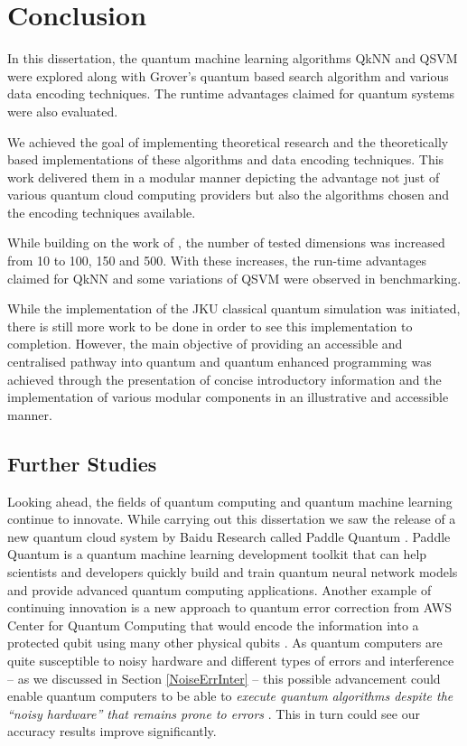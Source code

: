 \chapter{Conclusion}

In this dissertation, the quantum machine learning algorithms QkNN and QSVM were explored along with Grover's quantum based search algorithm and various data encoding techniques. The runtime advantages claimed for quantum systems were also evaluated.


We achieved the goal of implementing theoretical research and the theoretically based implementations of these algorithms and data encoding techniques. This work delivered them in a modular manner depicting the advantage not just of various quantum cloud computing providers but also the algorithms chosen and the encoding techniques available.


 While building on the work of \citep{sharmaQeml}, the number of tested dimensions was increased from 10 to 100, 150 and 500. With these increases, the run-time advantages claimed for QkNN and some variations of QSVM were observed in benchmarking.
 
 
While the implementation of the JKU classical quantum simulation was initiated, there is still more work to be done in order to see this implementation to completion. However, the main objective of providing an accessible and centralised pathway into quantum and quantum enhanced programming was achieved through the presentation of concise introductory information
and the implementation of various modular components in an illustrative and accessible manner.

\section{Further Studies}
Looking ahead, the fields of quantum computing and quantum machine learning continue to innovate. While carrying out this dissertation we saw the release of a new quantum cloud system by Baidu Research called Paddle Quantum \citep{Baiduo}. Paddle Quantum is a quantum machine learning development toolkit that can help scientists and developers quickly build and train quantum neural network models and provide advanced quantum computing applications. Another example of continuing innovation is a new approach to quantum error correction from AWS Center for Quantum Computing that would encode the information into a protected qubit using many other physical qubits \citep{Amaz}. As quantum computers are quite susceptible to noisy hardware and different types of errors and interference -- as we discussed in Section \ref{NoiseErrInter} -- this possible advancement could enable quantum computers to be able to \emph{execute quantum algorithms despite the “noisy hardware” that remains prone to errors} \citep{Amaz}. This in turn could see our accuracy results improve significantly.


